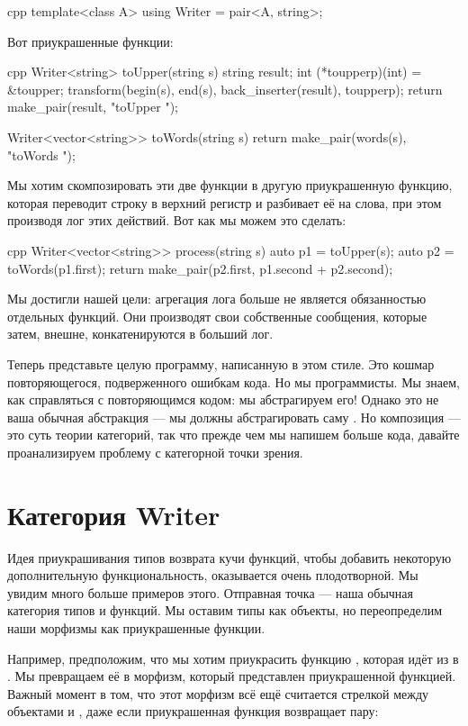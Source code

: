 \begin{snip}{cpp}
template<class A>
using Writer = pair<A, string>;
\end{snip}
Вот приукрашенные функции:

\begin{snip}{cpp}
Writer<string> toUpper(string s) {
    string result;
    int (*toupperp)(int) = &toupper;
    transform(begin(s), end(s), back_inserter(result), toupperp);
    return make_pair(result, "toUpper "); 
}

Writer<vector<string>> toWords(string s) { 
    return make_pair(words(s), "toWords ");
}
\end{snip}
Мы хотим скомпозировать эти две функции в другую приукрашенную функцию,
которая переводит строку в верхний регистр и разбивает её на слова, при этом
производя лог этих действий. Вот как мы можем это сделать:

\begin{snip}{cpp}
Writer<vector<string>> process(string s) {
    auto p1 = toUpper(s);
    auto p2 = toWords(p1.first);
    return make_pair(p2.first, p1.second + p2.second);
}
\end{snip}
Мы достигли нашей цели: агрегация лога больше не является
обязанностью отдельных функций. Они производят свои собственные
сообщения, которые затем, внешне, конкатенируются в больший лог.

Теперь представьте целую программу, написанную в этом стиле. Это кошмар
повторяющегося, подверженного ошибкам кода. Но мы программисты. Мы знаем, как
справляться с повторяющимся кодом: мы абстрагируем его! Однако это не ваша
обычная абстракция --- мы должны абстрагировать саму . Но композиция --- это суть теории категорий,
так что прежде чем мы напишем больше кода, давайте проанализируем проблему с
категорной точки зрения.

\section{Категория Writer}

Идея приукрашивания типов возврата кучи функций, чтобы
добавить некоторую дополнительную функциональность, оказывается очень
плодотворной. Мы увидим много больше примеров этого. Отправная точка --- наша
обычная категория типов и функций. Мы оставим типы как
объекты, но переопределим наши морфизмы как приукрашенные функции.

Например, предположим, что мы хотим приукрасить функцию
, которая идёт из  в . Мы превращаем её
в морфизм, который представлен приукрашенной функцией. Важный
момент в том, что этот морфизм всё ещё считается стрелкой
между объектами  и , даже если
приукрашенная функция возвращает пару:

